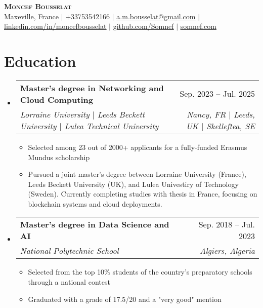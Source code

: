 \documentclass[letterpaper,11t]{article}
\makeatletter
\newcommand{\resumeItem}[1]{
  \item\small{
    {#1 \vspace{-2pt}}
  }
}
\newcommand{\resumeSubheading}[4]{
  \vspace{-2pt}\item
    \begin{tabular*}{0.97\textwidth}[t]{l@{\extracolsep{\fill}}r}
      \textbf{#1} & #2 \\
      \textit{\small#3} & \textit{\small #4} \\
    \end{tabular*}\vspace{-7pt}
}
\newcommand{\resumeSubHeadingListStart}{\begin{itemize}[leftmargin=0.15in, label={}]}
\newcommand{\resumeSubHeadingListEnd}{\end{itemize}}
\newcommand{\resumeItemListStart}{\begin{itemize}}
\newcommand{\resumeItemListEnd}{\end{itemize}\vspace{-5pt}}
\makeatother
\begin{document}

\begin{center}
    \textbf{\Huge \scshape Moncef Bousselat} \\ \vspace{1pt}
    \small Maxeville, France $|$ 
    \small +33753542166 $|$ 
    \href{mailto:a.m.bousselat@gmail.com@gmail.com}{\underline{a.m.bousselat@gmail.com}} $|$ 
    \href{https://www.linkedin.com/in/moncefbousselat/}{\underline{linkedin.com/in/moncefbousselat}} $|$
    \href{https://github.com/Somnef}{\underline{github.com/Somnef}} $|$
    \href{https://www.somnef.com}{\underline{somnef.com}}
\end{center}


\section{Education}
    \resumeSubHeadingListStart
        \resumeSubheading
        {Master's degree in Networking and Cloud Computing}{Sep. 2023 -- Jul. 2025}
        {Lorraine University $|$ Leeds Beckett University $|$ Lulea Technical University}{Nancy, FR $|$ Leeds, UK $|$ Skelleftea, SE}
            \resumeItemListStart
                \resumeItem{Selected among 23 out of 2000+ applicants for a fully-funded Erasmus Mundus scholarship}
                \resumeItem{Pursued a joint master's degree between Lorraine University (France), Leeds Beckett University (UK), and Lulea Univestiry of Technology (Sweden). Currently completing studies with thesis in France, focusing on blockchain systems and cloud deployments.}
            \resumeItemListEnd
      
        \resumeSubheading
        {Master's degree in Data Science and AI}{Sep. 2018 -- Jul. 2023}
        {National Polytechnic School}{Algiers, Algeria}
            \resumeItemListStart
                \resumeItem{Selected from the top 10\% students of the country's preparatory schools through a national contest}
                \resumeItem{Graduated with a grade of 17.5/20 and a "very good" mention}
            \resumeItemListEnd
  \resumeSubHeadingListEnd
\end{document}

